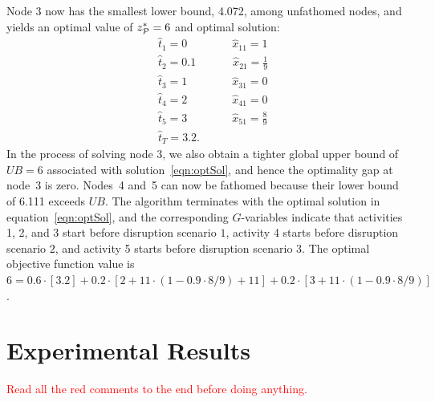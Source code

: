 \documentclass[11pt]{article}
\newcommand{\cP}{{\cal P}}
\newcommand{\tcr}{\textcolor{red}}
\begin{document}
	Node 3 now has the smallest lower bound, 4.072, among unfathomed nodes, and yields an optimal value of $z^*_{\cP} = 6$ and optimal solution: 
	\begin{subequations} \label{eqn:optSol}
        	\begin{align}
        	    & \hat{t}_1 = 0 \qquad \qquad \hat{x}_{11} = 1\\
        	    & \hat{t}_2 = 0.1 \qquad \quad\; \hat{x}_{21} = \frac{1}{9}\\
        	    & \hat{t}_3 = 1 \qquad \qquad \hat{x}_{31} = 0\\
        	    & \hat{t}_4 = 2 \qquad \qquad \hat{x}_{41} = 0\\
        	    & \hat{t}_5 = 3 \qquad \qquad \hat{x}_{51} = \frac{8}{9}\\
        	    & \hat{t}_T = 3.2.
        	\end{align}
    	\end{subequations}
    In the process of solving node 3, we also obtain a tighter global upper bound of $UB=6$ associated with solution~\eqref{eqn:optSol}, and hence the optimality gap at node~3 is zero. Nodes~4 and~5 can now be fathomed because their lower bound of 6.111 exceeds $UB$. The algorithm terminates with the optimal solution in equation~\eqref{eqn:optSol}, and the corresponding \(G\)-variables indicate that activities 1, 2, and 3 start before disruption scenario \(1\), activity 4 starts before disruption scenario \(2\), and activity 5 starts before disruption scenario \(3\). The optimal objective function value is $6= {0.6 \cdot \left [ 3.2 \right]  + 0.2 \cdot \left [ 2+ 11 \cdot (1-0.9 \cdot 8/9)+11 \right ]  + 0.2 \cdot \left [ 3 +11\cdot (1-0.9 \cdot 8/9) \right ]}$. 

\section{Experimental Results} \label{sec:results}
\tcr{Read all the red comments to the end before doing anything.}
\end{document}
